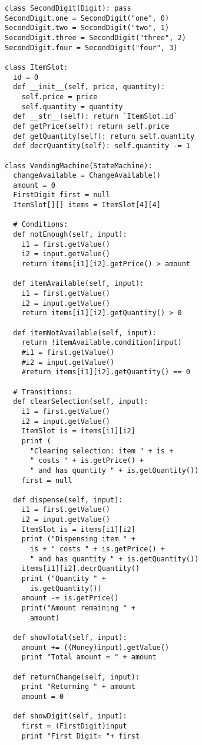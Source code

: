 \begin{lstlisting}
class SecondDigit(Digit): pass 
SecondDigit.one = SecondDigit("one", 0) 
SecondDigit.two = SecondDigit("two", 1) 
SecondDigit.three = SecondDigit("three", 2) 
SecondDigit.four = SecondDigit("four", 3) 

class ItemSlot: 
  id = 0 
  def __init__(self, price, quantity): 
    self.price = price 
    self.quantity = quantity 
  def __str__(self): return `ItemSlot.id` 
  def getPrice(self): return self.price  
  def getQuantity(self): return self.quantity  
  def decrQuantity(self): self.quantity -= 1 
  
class VendingMachine(StateMachine): 
  changeAvailable = ChangeAvailable() 
  amount = 0 
  FirstDigit first = null 
  ItemSlot[][] items = ItemSlot[4][4] 
  
  # Conditions: 
  def notEnough(self, input): 
    i1 = first.getValue() 
    i2 = input.getValue() 
    return items[i1][i2].getPrice() > amount 
    
  def itemAvailable(self, input): 
    i1 = first.getValue() 
    i2 = input.getValue() 
    return items[i1][i2].getQuantity() > 0 
    
  def itemNotAvailable(self, input): 
    return !itemAvailable.condition(input) 
    #i1 = first.getValue() 
    #i2 = input.getValue() 
    #return items[i1][i2].getQuantity() == 0 
    
  # Transitions: 
  def clearSelection(self, input): 
    i1 = first.getValue() 
    i2 = input.getValue() 
    ItemSlot is = items[i1][i2] 
    print ( 
      "Clearing selection: item " + is + 
      " costs " + is.getPrice() + 
      " and has quantity " + is.getQuantity()) 
    first = null 
    
  def dispense(self, input): 
    i1 = first.getValue() 
    i2 = input.getValue() 
    ItemSlot is = items[i1][i2] 
    print ("Dispensing item " +  
      is + " costs " + is.getPrice() + 
      " and has quantity " + is.getQuantity()) 
    items[i1][i2].decrQuantity() 
    print ("Quantity " +  
      is.getQuantity()) 
    amount -= is.getPrice() 
    print("Amount remaining " +  
      amount) 
      
  def showTotal(self, input): 
    amount += ((Money)input).getValue() 
    print "Total amount = " + amount 
    
  def returnChange(self, input): 
    print "Returning " + amount 
    amount = 0 
    
  def showDigit(self, input): 
    first = (FirstDigit)input 
    print "First Digit= "+ first 
    

\end{lstlisting}
